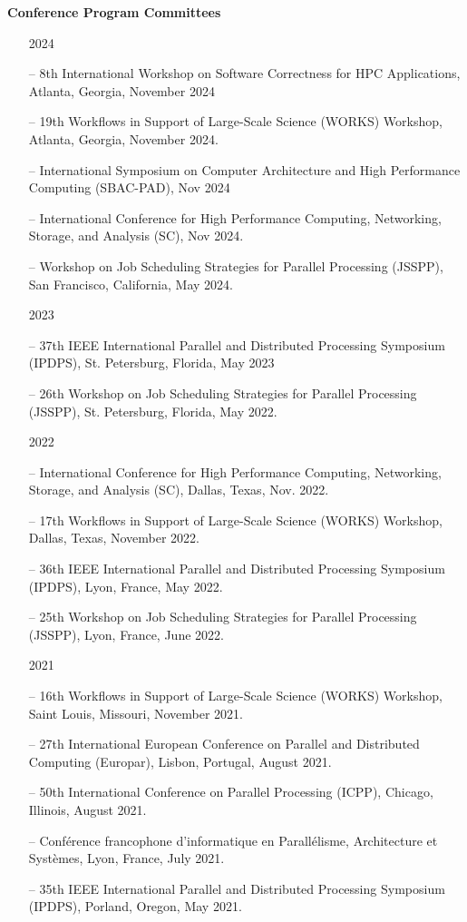 \documentclass[times,11pt]{letter}
\begin{document}
\noindent
{\bf Conference Program Committees}
\begin{itemize}

\item [2024]
\item[--]  8th International Workshop on Software Correctness for HPC Applications, Atlanta, Georgia, November 2024
\item[--]  19th Workflows in Support of Large-Scale Science (WORKS) Workshop, Atlanta, Georgia,  November 2024.
\item [--] International Symposium on Computer Architecture and High Performance Computing (SBAC-PAD), Nov 2024
\item [--] International Conference for High Performance Computing, Networking, Storage, and Analysis (SC), Nov 2024.
\item[--]  Workshop on Job Scheduling Strategies for Parallel Processing (JSSPP), San Francisco, California, May 2024.

\item [2023]
\item [--] 37th IEEE International Parallel and Distributed Processing Symposium (IPDPS), St. Petersburg, Florida, May 2023
\item[--]  26th Workshop on Job Scheduling Strategies for Parallel Processing (JSSPP), St. Petersburg, Florida, May 2022.

\item [2022]
\item[--]  International Conference for High Performance Computing, Networking, Storage, and Analysis (SC), Dallas, Texas, Nov. 2022.
\item[--]  17th Workflows in Support of Large-Scale Science (WORKS) Workshop, Dallas, Texas,  November 2022.
\item [--] 36th IEEE International Parallel and Distributed Processing Symposium (IPDPS), Lyon, France, May 2022.
\item[--]  25th Workshop on Job Scheduling Strategies for Parallel Processing (JSSPP), Lyon, France, June 2022.

\item [2021]
\item[--]  16th Workflows in Support of Large-Scale Science (WORKS) Workshop, Saint Louis, Missouri,  November 2021.
\item [--] 27th International European Conference on Parallel and Distributed Computing (Europar), Lisbon, Portugal, August 2021.
\item [--] 50th International Conference on Parallel Processing  (ICPP), Chicago, Illinois, August 2021.
\item [--] Conf\'erence francophone d'informatique en Parall\'elisme, Architecture et Syst\`emes, Lyon, France, July 2021.
\item [--] 35th IEEE International Parallel and Distributed Processing Symposium (IPDPS), Porland, Oregon, May 2021.


\end{itemize}
\end{document}
